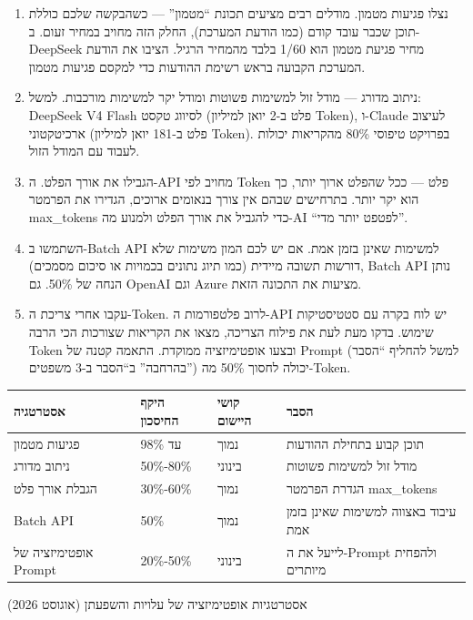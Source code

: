 \begin{enumerate}
  \item נצלו פגיעות מטמון. מודלים רבים מציעים תכונת “מטמון” — כשהבקשה שלכם כוללת תוכן שכבר עובד קודם (כמו הודעת המערכת), החלק הזה מחויב במחיר זעום. ב-DeepSeek מחיר פגיעת מטמון הוא 1/60 בלבד מהמחיר הרגיל. הציבו את הודעת המערכת הקבועה בראש רשימת ההודעות כדי למקסם פגיעות מטמון.
  \item ניתוב מדורג — מודל זול למשימות פשוטות ומודל יקר למשימות מורכבות. למשל: DeepSeek V4 Flash לסיווג טקסט (פלט ב-2 יואן למיליון Token), ו-Claude לעיצוב ארכיטקטוני (פלט ב-181 יואן למיליון Token). בפרויקט טיפוסי 80\% מהקריאות יכולות לעבוד עם המודל הזול.
  \item הגבילו את אורך הפלט. ה-API מחויב לפי Token פלט — ככל שהפלט ארוך יותר, כך הוא יקר יותר. בתרחישים שבהם אין צורך בנאומים ארוכים, הגדירו את הפרמטר max\_tokens כדי להגביל את אורך הפלט ולמנוע מה-AI “לפטפט יותר מדי”.
  \item השתמשו ב-Batch API למשימות שאינן בזמן אמת. אם יש לכם המון משימות שלא דורשות תשובה מיידית (כמו תיוג נתונים בכמויות או סיכום מסמכים), Batch API נותן הנחה של 50\%. גם OpenAI וגם Azure מציעות את התכונה הזאת.
  \item עקבו אחרי צריכת ה-Token. לרוב פלטפורמות ה-API יש לוח בקרה עם סטטיסטיקות שימוש. בדקו מעת לעת את פילוח הצריכה, מצאו את הקריאות שצורכות הכי הרבה Token ובצעו אופטימיזציה ממוקדת. התאמה קטנה של Prompt (למשל להחליף “הסבר בהרחבה” ב“הסבר ב-3 משפטים”) יכולה לחסוך 50\% מה-Token.
\end{enumerate}

\begin{center}
\begin{tabularx}{\linewidth}{|X|X|X|X|}
\hline
\textbf{אסטרטגיה} & \textbf{היקף החיסכון} & \textbf{קושי היישום} & \textbf{הסבר} \tabularnewline
\hline
פגיעות מטמון & עד 98\% & נמוך & תוכן קבוע בתחילת ההודעות \tabularnewline
ניתוב מדורג & 50\%-80\% & בינוני & מודל זול למשימות פשוטות \tabularnewline
הגבלת אורך פלט & 30\%-60\% & נמוך & הגדרת הפרמטר max\_tokens \tabularnewline
Batch API & 50\% & נמוך & עיבוד באצווה למשימות שאינן בזמן אמת \tabularnewline
אופטימיזציה של Prompt & 20\%-50\% & בינוני & לייעל את ה-Prompt ולהפחית מיותרים \tabularnewline
\hline
\end{tabularx}
\end{center}

\begin{center}\small\color{gray}אסטרטגיות אופטימיזציה של עלויות והשפעתן (אוגוסט 2026)\end{center}

